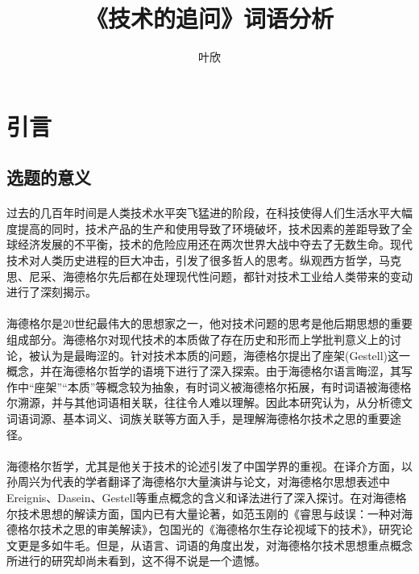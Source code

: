 \documentclass{article}
\author{叶欣}
\title{《技术的追问》词语分析}
\begin{document}
   
\maketitle   



\begin{abstract}

\end{abstract}



\tableofcontents

\section{引言} 

	\subsection{选题的意义} 
		\paragraph{}
过去的几百年时间是人类技术水平突飞猛进的阶段，在科技使得人们生活水平大幅度提高的同时，技术产品的生产和使用导致了环境破坏，技术因素的差距导致了全球经济发展的不平衡，技术的危险应用还在两次世界大战中夺去了无数生命。现代技术对人类历史进程的巨大冲击，引发了很多哲人的思考。纵观西方哲学，马克思、尼采、海德格尔先后都在处理现代性问题，都针对技术工业给人类带来的变动进行了深刻揭示。
		\paragraph{}
海德格尔是20世纪最伟大的思想家之一，他对技术问题的思考是他后期思想的重要组成部分。海德格尔对现代技术的本质做了存在历史和形而上学批判意义上的讨论，被认为是最晦涩的。针对技术本质的问题，海德格尔提出了座架(Gestell)这一概念，并在海德格尔哲学的语境下进行了深入探索。由于海德格尔语言晦涩，其写作中“座架”“本质”等概念较为抽象，有时词义被海德格尔拓展，有时词语被海德格尔溯源，并与其他词语相关联，往往令人难以理解。因此本研究认为，从分析德文词语词源、基本词义、词族关联等方面入手，是理解海德格尔技术之思的重要途径。
		\paragraph{}
海德格尔哲学，尤其是他关于技术的论述引发了中国学界的重视。在译介方面，以孙周兴为代表的学者翻译了海德格尔大量演讲与论文，对海德格尔思想表述中Ereignis、Dasein、Gestell等重点概念的含义和译法进行了深入探讨。在对海德格尔技术思想的解读方面，国内已有大量论著，如范玉刚的《睿思与歧误：一种对海德格尔技术之思的审美解读》，包国光的《海德格尔生存论视域下的技术》，研究论文更是多如牛毛。但是，从语言、词语的角度出发，对海德格尔技术思想重点概念所进行的研究却尚未看到，这不得不说是一个遗憾。
\end{document}
